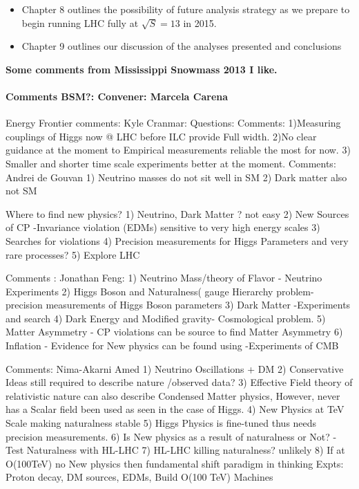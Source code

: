 \begin{itemize}
\item Chapter 8 outlines the possibility of future analysis strategy as we prepare to begin running LHC fully at $\sqrt{S} = 13$ \TeV in 2015. 


\item Chapter 9 outlines our discussion of the analyses presented and conclusions

\end{itemize}


\textbf{Some comments from Mississippi Snowmass 2013 I like.}
\paragraph*{Comments BSM?: Convener: Marcela Carena}
Energy Frontier
comments: Kyle Cranmar:
Questions: 
Comments: 
1)Measuring couplings of Higgs now @ LHC before ILC provide Full width.
2)No clear guidance at the moment to Empirical measurements reliable the most for now.
3) Smaller and shorter  time scale experiments better at the moment.
Comments: Andrei de Gouvan
1) Neutrino masses do not sit well in SM
2) Dark matter also not SM

Where to find new physics?
1) Neutrino, Dark Matter ? not easy
2) New Sources of CP -Invariance violation (EDMs) sensitive to very high energy scales
3)  Searches for violations
4) Precision measurements for Higgs Parameters and very rare processes?
5)  Explore LHC

Comments : Jonathan Feng:
1)  Neutrino Mass/theory of  Flavor - Neutrino Experiments
2) Higgs Boson and Naturalness( gauge Hierarchy problem- precision measurements of Higgs Boson parameters
3) Dark Matter -Experiments and search
4) Dark Energy and Modified gravity- Cosmological problem.
5) Matter Asymmetry - CP violations can be source to find Matter Asymmetry
6)  Inflation - Evidence for New physics can be found using -Experiments of CMB

Comments: Nima-Akarni Amed
1) Neutrino Oscillations + DM
2) Conservative Ideas still required to describe nature /observed data?
3) Effective Field theory of relativistic nature can also describe Condensed Matter physics, However, never has
a Scalar field been used as seen in the case of Higgs.
4) New Physics at TeV Scale making naturalness stable
5) Higgs Physics is fine-tuned thus needs precision measurements.
6) Is New physics as a result of naturalness or Not? - Test Naturalness with HL-LHC
7) HL-LHC killing naturalness? unlikely
8) If at O(100TeV) no New physics then fundamental shift paradigm in thinking
Expts: Proton decay,  DM sources, EDMs,  Build O(100 TeV) Machines

